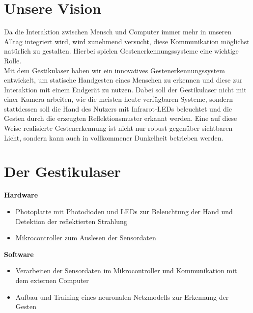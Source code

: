 ﻿\documentclass{sciposter}
\begin{document}
\begin{multicols}{3}
\setlength{\parindent}{2em}

\section{Unsere Vision}
\noindent
Da die Interaktion zwischen Mensch und Computer immer mehr in unseren Alltag integriert wird, wird zunehmend versucht, diese Kommunikation möglichst natürlich zu gestalten. Hierbei spielen Gestenerkennungssysteme eine wichtige Rolle. \\
Mit dem Gestikulaser haben wir ein innovatives Gestenerkennungssystem entwickelt, um statische Handgesten eines Menschen zu erkennen und diese zur Interaktion mit einem Endgerät zu nutzen. Dabei soll der Gestikulaser nicht mit einer Kamera arbeiten, wie die meisten heute verfügbaren Systeme, sondern stattdessen soll die Hand des Nutzers mit Infrarot-LEDs beleuchtet und die Gesten durch die erzeugten Reflektionsmuster erkannt werden. Eine auf diese Weise realisierte Gestenerkennung ist nicht nur robust gegenüber sichtbaren Licht, sondern kann auch in vollkommener Dunkelheit betrieben werden. \\


\section{Der Gestikulaser}
\noindent
\textbf{Hardware}
\begin{itemize}
	\item Photoplatte mit Photodioden und LEDs zur Beleuchtung der Hand und Detektion der reflektierten Strahlung
	\item Mikrocontroller zum Auslesen der Sensordaten
\end{itemize}

\noindent
\textbf{Software}
\begin{itemize}
	\item Verarbeiten der Sensordaten im Mikrocontroller und Kommunikation mit dem externen Computer
	\item Aufbau und Training eines neuronalen Netzmodells zur Erkennung der Gesten
\end{itemize}


\end{multicols}
\end{document}
